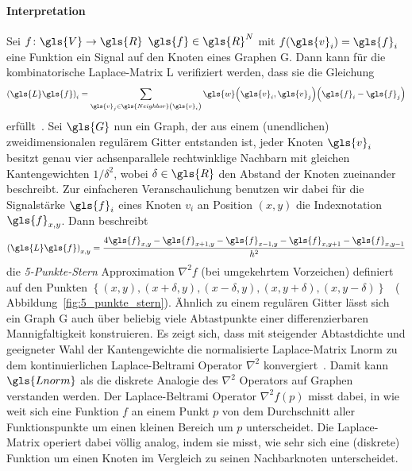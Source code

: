 \paragraph{Interpretation}
\label{laplace_interpretation}



Sei $f \colon \gls{V} \to \gls{R}$ \bzw{} $\gls{f} \in \gls{R}^N$ mit $f\left(\gls{v}_i\right) = \gls{f}_i$ eine Funktion \bzw{} ein Signal auf den Knoten eines Graphen \gls{G}.
Dann kann für die kombinatorische Laplace-Matrix \gls{L} verifiziert werden, dass sie die Gleichung
\begin{equation*}
  {\left(\gls{L}\gls{f}\right)}_i = \sum_{\gls{v}_j \in \gls{Neighbor}\left(\gls{v}_i\right)} \gls{w}\left(\gls{v}_i, \gls{v}_j\right) \left(\gls{f}_i - \gls{f}_j\right)
\end{equation*}
erfüllt~\cite{Hammond}.
Sei $\gls{G}$ nun ein Graph, der aus einem (unendlichen) zweidimensionalen regulärem Gitter entstanden ist, \dhe{} jeder Knoten $\gls{v}_i$ besitzt genau vier achsenparallele rechtwinklige Nachbarn mit gleichen Kantengewichten $1/\delta^2$, wobei $\delta \in \gls{R}$ den Abstand der Knoten zueinander beschreibt.
Zur einfacheren Veranschaulichung benutzen wir dabei für die Signalstärke $\gls{f}_i$ eines Knoten $v_i$ an Position $\left(x, y\right)$ die Indexnotation $\gls{f}_{x,y}$.
Dann beschreibt
\begin{equation*}
  {\left(\gls{L}\gls{f}\right)}_{x,y} = \frac{4\gls{f}_{x,y} - \gls{f}_{x+1,y} - \gls{f}_{x-1,y} - \gls{f}_{x,y+1} - \gls{f}_{x,y-1}}{h^2}
\end{equation*}
die \emph{5-Punkte-Stern} Approximation $\nabla^2 f$ (bei umgekehrtem Vorzeichen) definiert auf den Punkten $\left\{\left(x,y\right), \left(x+\delta,y\right), \left(x-\delta,y\right), \left(x,y + \delta\right),\left(x,y-\delta\right)\right\}$~\cite{Hammond} (\vgl{} Abbildung~\ref{fig:5_punkte_stern}).
Ähnlich zu einem regulären Gitter lässt sich ein Graph \gls{G} auch über beliebig viele Abtastpunkte einer differenzierbaren Mannigfaltigkeit konstruieren.
Es zeigt sich, dass mit steigender Abtastdichte und geeigneter Wahl der Kantengewichte die normalisierte Laplace-Matrix \gls{Lnorm} zu dem kontinuierlichen Laplace-Beltrami Operator $\nabla^2$ konvergiert~\cite{Hammond}.
Damit kann $\gls{Lnorm}$ als die diskrete Analogie des $\nabla^2$ Operators auf Graphen verstanden werden.
Der Laplace-Beltrami Operator $\nabla^2 f\left(p\right)$ misst dabei, in wie weit sich eine Funktion $f$ an einem Punkt $p$ von dem Durchschnitt aller Funktionspunkte um einen kleinen Bereich um $p$ unterscheidet.
Die Laplace-Matrix operiert dabei völlig analog, indem sie misst, wie sehr sich eine (diskrete) Funktion um einen Knoten im Vergleich zu seinen Nachbarknoten unterscheidet.

